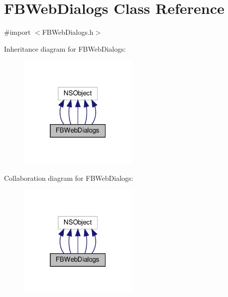 \hypertarget{interfaceFBWebDialogs}{}\section{F\+B\+Web\+Dialogs Class Reference}
\label{interfaceFBWebDialogs}


{\ttfamily \#import $<$F\+B\+Web\+Dialogs.\+h$>$}



Inheritance diagram for F\+B\+Web\+Dialogs\+:
\nopagebreak
\begin{figure}[H]
\begin{center}
\leavevmode
\includegraphics[width=163pt]{interfaceFBWebDialogs__inherit__graph}
\end{center}
\end{figure}


Collaboration diagram for F\+B\+Web\+Dialogs\+:
\nopagebreak
\begin{figure}[H]
\begin{center}
\leavevmode
\includegraphics[width=163pt]{interfaceFBWebDialogs__coll__graph}
\end{center}
\end{figure}
